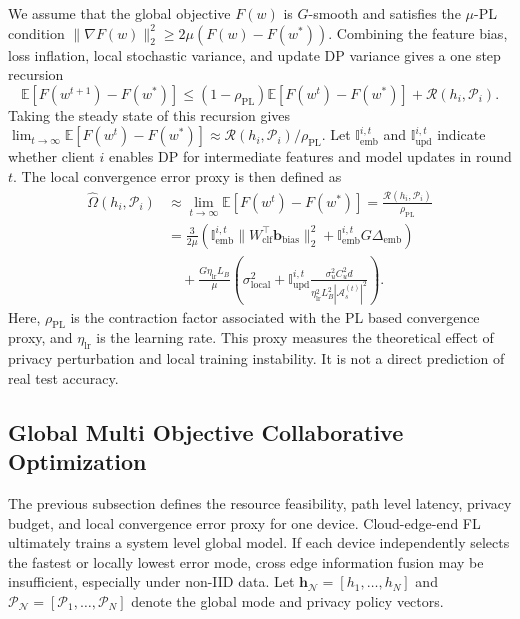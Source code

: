 ﻿\documentclass[preprint,12pt]{elsarticle}
\theoremstyle{plain}
\theoremstyle{definition}
\theoremstyle{remark}
\begin{document}
We assume that the global objective \(F(w)\) is \(G\)-smooth and satisfies the \(\mu\)-PL condition
\(\|\nabla F(w)\|_2^2\ge 2\mu(F(w)-F(w^*))\).
Combining the feature bias, loss inflation, local stochastic variance, and update DP variance gives a one step recursion
\begin{equation}
\mathbb{E}[F(w^{t+1})-F(w^*)]
\le
(1-\rho_{\mathrm{PL}})\mathbb{E}[F(w^t)-F(w^*)]
+\mathcal{R}(h_i,\mathcal{P}_i).
\label{eq:pl_recursion}
\end{equation}
Taking the steady state of this recursion gives
\(\lim_{t\to\infty}\mathbb{E}[F(w^t)-F(w^*)]\approx \mathcal{R}(h_i,\mathcal{P}_i)/\rho_{\mathrm{PL}}\).
Let \(\mathbb{I}_{\mathrm{emb}}^{i,t}\) and \(\mathbb{I}_{\mathrm{upd}}^{i,t}\) indicate whether client \(i\) enables DP for intermediate features and model updates in round \(t\).
The local convergence error proxy is then defined as
\begin{equation}
\begin{aligned}
    \widehat{\Omega}(h_i,\mathcal{P}_i)
    &\approx \lim_{t \to \infty}\mathbb{E}[F(w^t)-F(w^*)]
    = \frac{\mathcal{R}(h_i,\mathcal{P}_i)}{\rho_{\mathrm{PL}}} \\
    &= \frac{3}{2\mu}\left(\mathbb{I}_{\mathrm{emb}}^{i,t}\|W_{\mathrm{clf}}^\top \mathbf{b}_{\mathrm{bias}}\|_2^2
    + \mathbb{I}_{\mathrm{emb}}^{i,t}G \Delta_{\mathrm{emb}}\right) \\
    &\quad + \frac{G\eta_{\mathrm{lr}} L_B}{\mu}\left(\sigma_{\mathrm{local}}^2
    + \mathbb{I}_{\mathrm{upd}}^{i,t}\frac{\sigma_u^2C_u^2d}{\eta_{\mathrm{lr}}^2L_B^2|\mathcal{A}_s^{(t)}|^2}\right).
\end{aligned}
\label{eq:local_omega}
\end{equation}
Here, \(\rho_{\mathrm{PL}}\) is the contraction factor associated with the PL based convergence proxy, and \(\eta_{\mathrm{lr}}\) is the learning rate.
This proxy measures the theoretical effect of privacy perturbation and local training instability.
It is not a direct prediction of real test accuracy.

\subsection{Global Multi Objective Collaborative Optimization}
\label{sec:global_optimization}
The previous subsection defines the resource feasibility, path level latency, privacy budget, and local convergence error proxy for one device.
Cloud-edge-end FL ultimately trains a system level global model.
If each device independently selects the fastest or locally lowest error mode, cross edge information fusion may be insufficient, especially under non-IID data.
Let \(\mathbf{h}_{\mathcal{N}}=[h_1,\dots,h_N]\) and \(\boldsymbol{\mathcal{P}}_{\mathcal{N}}=[\mathcal{P}_1,\dots,\mathcal{P}_N]\) denote the global mode and privacy policy vectors.
\end{document}
